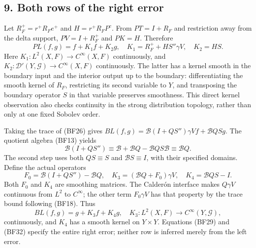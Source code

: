 \documentclass[
  11pt,
]{article}
\makeatletter
\let\ReaderOriginalAnchorStart\hyper@anchorstart
\let\ReaderOriginalAnchorEnd\hyper@anchorend
\let\ReaderPendingAliases\@empty
\def\ReaderArmAliases#1{\gdef\ReaderPendingAliases{#1}}
\def\hyper@anchorstart#1{\ReaderIfNativeAnchorTF{#1}{\ReaderPendingAliases\global\let\ReaderPendingAliases\@empty}{}\ReaderOriginalAnchorStart{#1}}
\makeatother
\begin{document}
\subsection{9. Both rows of the right
error}\label{both-rows-of-the-right-error}

Let \(R_F^+=r^+R_Fe^+\) and \(H=r^+R_FP^c\). From \(PT=I+R_F\) and
restriction away from the delta support, \(PV=I+R_F^+\) and \(PK=H\).
Therefore \[
 PL(f,g)=f+K_1f+K_2g,
 \quad K_1=R_F^++HS''\gamma V,\quad K_2=HS.
 \tag{BF29}
\] Here \(K_1:L^2(X,F)\to C^\infty(X,F)\) continuously, and
\(K_2:\mathcal D'(Y,\mathcal G)\to C^\infty(X,F)\) continuously. The
latter has a kernel smooth in the boundary input and the interior output
up to the boundary: differentiating the smooth kernel of \(R_F\),
restricting its second variable to \(Y\), and transposing the boundary
operator \(S\) in that variable preserves smoothness. This direct kernel
observation also checks continuity in the strong distribution topology,
rather than only at one fixed Sobolev order.

Taking the trace of (BF26) gives
\(BL(f,g)=\mathcal B(I+QS'')\gamma Vf+\mathcal BQSg\). The quotient
algebra (BF13) yields \[
 \mathcal B(I+QS'')
 \equiv\mathcal B+\mathcal BQ-\mathcal BQS\mathcal B
 \equiv\mathcal BQ.
 \tag{BF30}
\] The second step uses both \(QS\equiv S\) and \(\mathcal BS\equiv I\),
with their specified domains. Define the actual operators \[
 F_0=\mathcal B(I+QS'')-\mathcal BQ,\quad
 K_3=(\mathcal BQ+F_0)\gamma V,\quad
 K_4=\mathcal BQS-I.
 \tag{BF31}
\] Both \(F_0\) and \(K_4\) are smoothing matrices. The Calderón
interface makes \(Q\gamma V\) continuous from \(L^2\) to \(C^\infty\);
the other term \(F_0\gamma V\) has that property by the trace bound
following (BF18). Thus \[
 BL(f,g)=g+K_3f+K_4g,
 \quad K_3:L^2(X,F)\to C^\infty(Y,\mathcal G),
 \tag{BF32}
\] continuously, and \(K_4\) has a smooth kernel on \(Y\times Y\).
Equations (BF29) and (BF32) specify the entire right error; neither row
is inferred merely from the left error.

\ReaderArmAliases{\ReaderOriginalAnchorStart{AN03-GFB-010}\ReaderOriginalAnchorEnd\begingroup\expandafter\def\csname @currentHref\endcsname{AN03-GFB-010}\label{AN03-GFB-010}\endgroup\ReaderOriginalAnchorStart{an03-gfb-010-the-fredholm-realization-and-regularity-of-solutions}\ReaderOriginalAnchorEnd\begingroup\expandafter\def\csname @currentHref\endcsname{an03-gfb-010-the-fredholm-realization-and-regularity-of-solutions}\label{an03-gfb-010-the-fredholm-realization-and-regularity-of-solutions}\endgroup\ReaderOriginalAnchorStart{10-the-fredholm-realization-and-regularity-of-solutions}\ReaderOriginalAnchorEnd\begingroup\expandafter\def\csname @currentHref\endcsname{10-the-fredholm-realization-and-regularity-of-solutions}\label{10-the-fredholm-realization-and-regularity-of-solutions}\endgroup\ReaderOriginalAnchorStart{the-fredholm-realization-and-regularity-of-solutions}\ReaderOriginalAnchorEnd}
\end{document}

